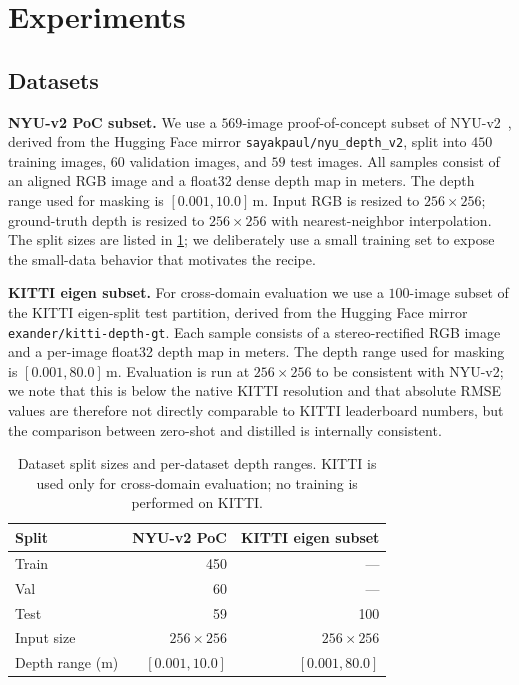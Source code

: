 \documentclass[10pt,twocolumn,letterpaper]{article}
\begin{document}
\section{Experiments}
\label{sec:experiments}

\subsection{Datasets}
\label{sec:datasets}

\textbf{NYU-v2 PoC subset.} We use a $569$-image
proof-of-concept subset of NYU-v2~\cite{silberman2012nyuv2}, derived from
the Hugging Face mirror \texttt{sayakpaul/nyu\_depth\_v2}, split into
$450$ training images, $60$ validation images, and $59$ test images. All
samples consist of an aligned RGB image and a float32 dense depth map in
meters. The depth range used for masking is $[0.001, 10.0]$\,m. Input
RGB is resized to $256{\times}256$; ground-truth depth is resized to
$256{\times}256$ with nearest-neighbor interpolation. The split sizes
are listed in \cref{tab:datasplits}; we deliberately use a small training
set to expose the small-data behavior that motivates the recipe.

\textbf{KITTI eigen subset.} For cross-domain evaluation we use a
$100$-image subset of the KITTI eigen-split test partition, derived from
the Hugging Face mirror \texttt{exander/kitti-depth-gt}. Each sample
consists of a stereo-rectified RGB image and a per-image float32 depth
map in meters. The depth range used for masking is $[0.001, 80.0]$\,m.
Evaluation is run at $256{\times}256$ to be consistent with NYU-v2; we
note that this is below the native KITTI resolution and that absolute
RMSE values are therefore not directly comparable to KITTI leaderboard
numbers, but the comparison between zero-shot and distilled is
internally consistent.

\begin{table}[t]
\centering
\begin{tabular}{lrr}
\toprule
Split & NYU-v2 PoC & KITTI eigen subset \\
\midrule
Train & 450 & --- \\
Val   & 60  & --- \\
Test  & 59  & 100 \\
\midrule
Input size      & $256{\times}256$ & $256{\times}256$ \\
Depth range (m) & $[0.001, 10.0]$  & $[0.001, 80.0]$ \\
\bottomrule
\end{tabular}
\caption{Dataset split sizes and per-dataset depth ranges. KITTI is used
only for cross-domain evaluation; no training is performed on KITTI.}
\label{tab:datasplits}
\end{table}
\end{document}
